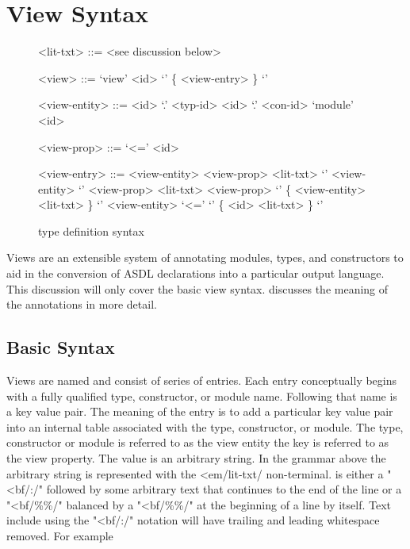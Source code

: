 \section{View Syntax}
\begin{figure}[ht]
  \begin{center}
    \begin{grammar}
      <lit-txt>     ::= <see discussion below>

      <view>        ::= `view' <id> `{' \{ <view-entry> \} `}'

      <view-entity> ::= <id> `.' <typ-id>
		  `.' <con-id>
		 \alt{} `module' <id>

      <view-prop>   ::= `<='  <id>

      <view-entry>  ::= <view-entity>  <view-prop> <lit-txt>
		 \alt{} `{' {<view-entity>} `}' <view-prop> <lit-txt>
		 \alt{} <view-prop> `{' \{ <view-entity> <lit-txt> \} `}'
		 \alt{} <view-entity> `<=' `{' \{ <id> <lit-txt> \} `}'
    \end{grammar}
  \end{center}
  \caption{\asdl{} type definition syntax}
\end{figure}%

Views are an extensible system of annotating modules, types, and
constructors to aid in the conversion of ASDL declarations into a
particular output language. This discussion will only cover the basic view
syntax.
 discusses the meaning of the annotations in more detail.

\subsection{Basic Syntax}
Views are named and consist of series of entries.
Each entry conceptually
begins with a fully qualified type, constructor, or module name. Following
that name is a key value pair.
The meaning of the entry is to add a
particular key value pair into an internal table associated with the type,
constructor, or module.
The type, constructor or module is referred to as
the view entity the key is referred to as the view property.
The value is an arbitrary string.
In the grammar above the arbitrary string is represented
with the <em/lit-txt/ non-terminal.  is either a "<bf/:/"
followed by some arbitrary text that continues to the end of the line or a
"<bf/\%\%/" balanced by a "<bf/\%\%/" at the beginning of a line by itself. 
Text include using the "<bf/:/" notation will have trailing and leading 
whitespace removed. For example


